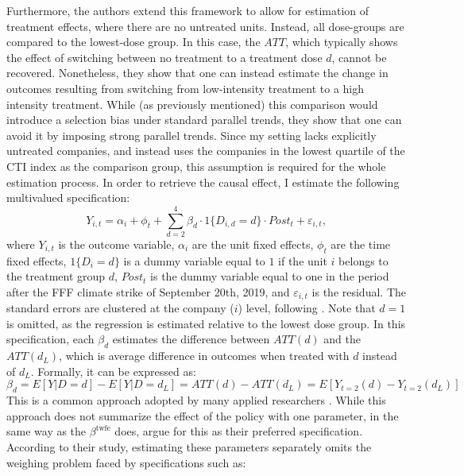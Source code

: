 \documentclass[12pt]{article}
\begin{document}
Furthermore, the authors extend this framework to allow for estimation of treatment effects, where there are no untreated units. Instead, all dose-groups are compared to the lowest-dose group. In this case, the $ATT$, which typically shows the effect of switching between no treatment to a treatment dose $d$, cannot be recovered. Nonetheless, they show that one can instead estimate the change in outcomes resulting from switching from low-intensity treatment to a high intensity treatment. While (as previously mentioned) this comparison would introduce a selection bias under standard parallel trends, they show that one can avoid it by imposing strong parallel trends. Since my setting lacks explicitly untreated companies, and instead uses the companies in the lowest quartile of the CTI index as the comparison group, this assumption is required for the whole estimation process. In order to retrieve the causal effect, I estimate the following multivalued specification:
\begin{equation}
    Y_{i,t} = \alpha_i + \phi_t + \sum_{d=2}^{4} \beta_d \cdot 1\{D_{i,d}=d\}\cdot Post_t + \varepsilon_{i,t},
\end{equation}
where $Y_{i,t}$ is the outcome variable, $\alpha_i$ are the unit fixed effects, $\phi_t$ are the time fixed effects, $1\{D_{i}=d\}$ is a dummy variable equal to $1$ if the unit $i$ belongs to the treatment group $d$, $Post_t$ is the dummy variable equal to one in the period after the FFF climate strike of September 20th, 2019, and $\varepsilon_{i,t}$ is the residual. The standard errors are clustered at the company ($i$) level, following \textcite{abadieWhenShouldYou2022}. Note that $d=1$ is omitted, as the regression is estimated relative to the lowest dose group. In this specification, each $\beta_d$ estimates the difference between $ATT(d)$ and the $ATT(d_L)$, which is average difference in outcomes when treated with $d$ instead of $d_L$. Formally, it can be expressed as: 
\begin{equation}
    \beta_d = E[Y|D = d] - E[Y |D = d_L] = ATT(d) - ATT(d_L) = E[Y_{t=2}(d) - Y_{t=2}(d_L)]
\end{equation}
This is a common approach adopted by many applied researchers \parencite{acemoglu_finkelstein_medicare,deschenes_greenstone_clim_change}. While this approach does not summarize the effect of the policy with one parameter, in the same way as the $\beta^{\text{twfe}}$ does, \citeauthor{callawayDifferenceinDifferencesContinuousTreatment2025} argue for this as their preferred specification. According to their study, estimating these parameters separately omits the weighing problem faced by specifications such as:
\end{document}
